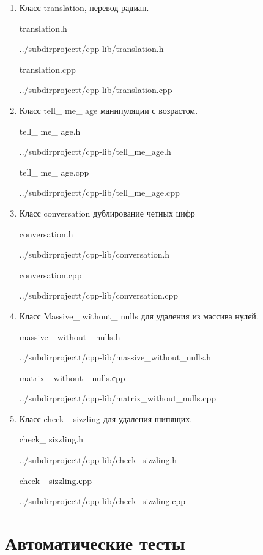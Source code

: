 \documentclass[12pt,a4paper]{report}
\begin{document}
\begin{enumerate}
	\item Класс translation, перевод радиан.
	
	translation.h
	
	{../subdirprojectt/cpp-lib/translation.h}
	
	\vspace{\baselineskip}
	
	translation.cpp
	
	{../subdirprojectt/cpp-lib/translation.cpp}
	
	\item Класс tell\_ me\_ age манипуляции с возрастом.
	
	tell\_ me\_ age.h
	
	{../subdirprojectt/cpp-lib/tell_me_age.h}
	
	\vspace{\baselineskip}
	
	tell\_ me\_ age.cpp
	
	{../subdirprojectt/cpp-lib/tell_me_age.cpp}
	
	\item Класс conversation дублирование четных цифр
	
	conversation.h
	
	{../subdirprojectt/cpp-lib/conversation.h}
	
	\vspace{\baselineskip}
	
	conversation.cpp
	
	{../subdirprojectt/cpp-lib/conversation.cpp}
	
	\item Класс Massive\_ without\_ nulls для удаления из массива нулей.
	
	massive\_ without\_ nulls.h
	
	{../subdirprojectt/cpp-lib/massive_without_nulls.h}
	
	matrix\_ without\_ nulls.сpp
	
	{../subdirprojectt/cpp-lib/matrix_without_nulls.cpp}	
	
	\item 	Класс check\_ sizzling для удаления шипящих.
		
	check\_ sizzling.h
	
	{../subdirprojectt/cpp-lib/check_sizzling.h}
	
	check\_ sizzling.сpp
	
	{../subdirprojectt/cpp-lib/check_sizzling.cpp}	
	
\end{enumerate}


\section{Автоматические тесты}

	
	
	
	
\end{document}
